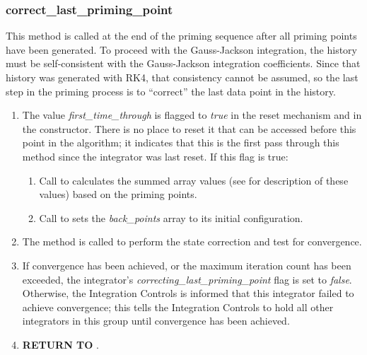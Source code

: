 \subsubsection{correct\_last\_priming\_point}
\label{ref:GJ_correct_last_priming_point}

This method is called at the end of the priming sequence after all
priming points have been generated. To proceed with the Gauss-Jackson
integration, the history must be self-consistent with the Gauss-Jackson
integration coefficients. Since that history was generated with RK4,
that consistency cannot be assumed, so the last step in the
priming process is to ``correct'' the last data point in the history.

\begin{enumerate}

\item The value \textit{first\_time\_through} is flagged to \textit{true}
in the reset mechanism and in the constructor. There is no place to
reset it that can be accessed before this point in the algorithm; it
indicates that this is the first pass through this method since the
integrator was last reset. If this flag is true:

\begin{enumerate}
\item Call to 
calculates the
summed array values (see 
for description of
these values) based on the priming points.

\item Call to 
sets the \textit{back\_points} array to its initial configuration.
\end{enumerate}

\item The method 
is called to perform the state
correction and test for convergence.

\item If convergence has been achieved, or the maximum iteration count
has been exceeded, the integrator's
\textit{correcting\_last\_priming\_point }flag is set to
\textit{false}. Otherwise, the Integration Controls is informed that
this integrator failed to achieve convergence; this tells the
Integration Controls to hold all other integrators in this group until
convergence has been achieved.

\item {\bfseries RETURN TO} .
\end{enumerate}

